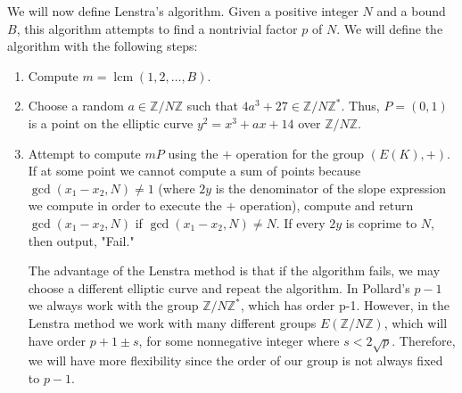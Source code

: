 \documentclass{article}
\DeclareMathOperator{\lcm}{lcm}
\begin{document}
\indent We will now define Lenstra's algorithm. Given a positive integer $N$ and a bound $B$, this algorithm attempts to find a nontrivial factor $p$ of $N$. We will define the algorithm with the following steps:
\begin{enumerate}
\item Compute $m=\lcm(1,2,\dotso,B)$. 
\item Choose a random $a \in \mathbb{Z}/N\mathbb{Z}$ such that $4a^3+27 \in \mathbb{Z}/N\mathbb{Z}^*$. Thus, $P=(0,1)$ is a point on the elliptic curve $y^2=x^3+ax+14$ over $\mathbb{Z}/N\mathbb{Z}$.
\item Attempt to compute $mP$ using the $+$ operation for the group $(E(K),+)$. If at some point we cannot compute a sum of points because $\gcd(x_1-x_2,N) \neq 1$ (where $2y$ is the denominator of the slope expression we compute in order to execute the $+$ operation), compute and return $\gcd(x_1-x_2,N)$ if $\gcd(x_1-x_2,N) \neq N$. If every $2y$ is coprime to $N$, then output, "Fail."

\indent The advantage of the Lenstra method is that if the algorithm fails, we may choose a different elliptic curve and repeat the algorithm. In Pollard's $p-1$ we always work with the group $\mathbb{Z}/N\mathbb{Z}^*$, which has order p-1. However, in the Lenstra method we work with many different groups $E(\mathbb{Z}/N\mathbb{Z})$, which will have order $p+1\pm s$, for some nonnegative integer where $s<2\sqrt{p}$. Therefore, we will have more flexibility since the order of our group is not always fixed to $p-1$.
\end{enumerate} 
\end{document}
